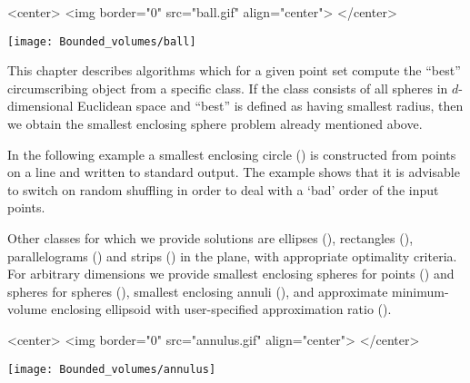 
\begin{ccHtmlOnly}
<center>
<img border="0" src="ball.gif" align="center">
</center>
\end{ccHtmlOnly} 

\begin{ccTexOnly}
\begin{center}
\texttt{[image: Bounded\_volumes/ball]}
\end{center}
\end{ccTexOnly}


This chapter describes algorithms which for a given point set compute
the ``best'' circumscribing  object from a specific
class. If the class consists of all spheres in $d$-dimensional
Euclidean space and ``best'' is defined as having smallest radius,
then we obtain the smallest enclosing sphere problem already mentioned
above.

In the following example a smallest enclosing circle
() is constructed from points 
on a line and written to standard output. The example
shows that it is advisable to switch on random shuffling 
in order to deal with a `bad' order of the input points. 


Other classes for which we provide solutions are ellipses
(), rectangles
(), parallelograms
() and strips ()
in the plane, with appropriate optimality criteria. For arbitrary
dimensions we provide smallest enclosing spheres for points
() and spheres for spheres
(), smallest enclosing
annuli (), and approximate
minimum-volume enclosing ellipsoid with user-specified
approximation ratio ().

\begin{ccHtmlOnly}
<center>
<img border="0" src="annulus.gif" align="center">
</center>
\end{ccHtmlOnly} 

\begin{ccTexOnly}
\begin{center}
\texttt{[image: Bounded\_volumes/annulus]}
\end{center}
\end{ccTexOnly}

